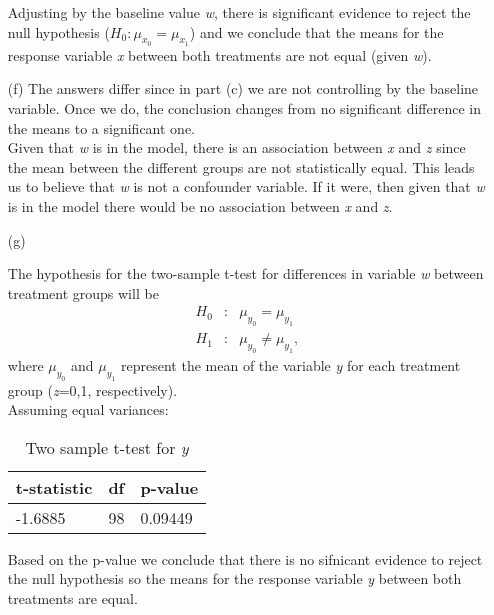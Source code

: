 \documentclass[11pt,a4paper]{article}
\begin{document}
\begin{enumerate}
Adjusting by the baseline value \emph{w}, there is significant evidence to reject the null hypothesis ($H_0:\mu_{x_0} =\mu_{x_1}$)
 and we conclude that the means for the response variable \emph{x} between both treatments are not equal (given \emph{w}). 



\item[(f)] The answers differ since in part (c) we are not controlling by the baseline variable. Once we do, the 
 conclusion changes from no significant difference in the means to a significant one.\\
Given that \emph{w} is in the model, there is an association between \emph{x} and \emph{z} since the 
mean between the different groups are not statistically equal. This leads us to believe that \emph{w} is not a confounder variable. If it were, then given that \emph{w} is in the model there would be
 no association between \emph{x} and \emph{z}. 


\newpage
\item[(g)]

The hypothesis for the two-sample t-test for differences in variable \emph{w} between treatment 
groups will be
\begin{eqnarray*}
  H_0 &:& \mu_{y_0} =\mu_{y_1}\\
  H_1 &:& \mu_{y_0} \neq \mu_{y_1},
\end{eqnarray*}
where $\mu_{y_0}$ and $\mu_{y_1}$ represent the mean of the variable \emph{y} for each treatment group (\emph{z}=0,1, respectively).\\
Assuming equal variances:

    \begin{table}[h!]
\centering
\begin{tabular}{lll}
\hline
t-statistic & df & p-value\\
\hline
-1.6885 & 98 & 0.09449\\
\hline
\end{tabular}
\caption{Two sample t-test for \emph{y}}
\end{table}

Based on the p-value we conclude that there is no sifnicant evidence to reject the null hypothesis so the 
means for the response variable \emph{y} between both treatments are equal. 


\end{enumerate}
\end{document}
